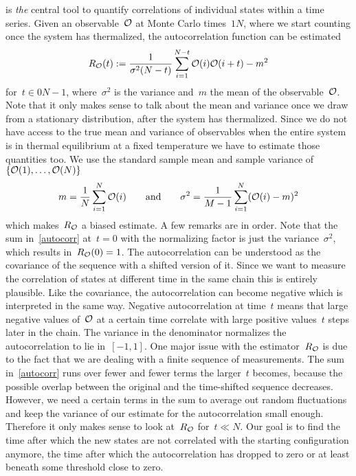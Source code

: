  is \emph{the} central tool to quantify correlations of
individual states within a time series. Given an observable~$\mathcal{O}$ at Monte Carlo
times~$\numlist{1}{N}$, where we start counting once the system has thermalized,
the autocorrelation function can be estimated
%
\begin{equation}\label{autocorr}
  R_{\mathcal{O}}(t) := \frac{1}{\sigma^2 (N-t)} \sum_{i = 1}^{N-t}
    \mathcal{O}(i) \mathcal{O}(i+t) - m^2
\end{equation}
%
for~$t \in \numlist{0}{N-1}$, where~$\sigma^2$ is the variance and~$m$ the mean
of the observable~$\mathcal{O}$. Note that it only makes sense to talk about the mean
and variance once we draw from a stationary distribution, \ie{} after the system
has thermalized. Since we do not have access to the true mean and variance of
observables when the entire system is in thermal equilibrium at a fixed
temperature we have to estimate those quantities too. We use the standard sample
mean and sample variance of~$\{\mathcal{O}(1),\dots,\mathcal{O}(N)\}$
%
\begin{equation}\label{samplemeanvar}
  m = \frac{1}{N} \sum_{i=1}^N \mathcal{O}(i) \qquad\text{and}\qquad
  \sigma^2 = \frac{1}{M-1} \sum_{i=1}^N (\mathcal{O}(i) - m)^2
\end{equation}
%
which makes~$R_{\mathcal{O}}$ a biased estimate. A few remarks are in order. Note that
the sum in~\eqref{autocorr} at~$t=0$ with the normalizing factor is just the
variance~$\sigma^2$, which results in~$R_{\mathcal{O}}(0) = 1$. The autocorrelation can
be understood as the covariance of the sequence with a shifted version of it.
Since we want to measure the correlation of states at different time in the same
chain this is entirely plausible. Like the covariance, the autocorrelation can
become negative which is interpreted in the same way. Negative autocorrelation
at time~$t$ means that large negative values of~$\mathcal{O}$ at a certain time
correlate with large positive values~$t$ steps later in the chain. The variance
in the denominator normalizes the autocorrelation to lie in~$[-1,1]$. One major
issue with the estimator~$R_{\mathcal{O}}$ is due to the fact that we are dealing with a
finite sequence of measurements. The sum in~\eqref{autocorr} runs over fewer and
fewer terms the larger~$t$ becomes, because the possible overlap between the
original and the time-shifted sequence decreases. However, we need a certain
terms in the sum to average out random fluctuations and keep the variance of our
estimate for the autocorrelation small enough. Therefore it only makes sense to
look at~$R_{\mathcal{O}}$ for~$t \ll N$. Our goal is to find the time after which the
new states are not correlated with the starting configuration anymore, \ie{} the
time after which the autocorrelation has dropped to zero or at least beneath
some threshold close to zero.

